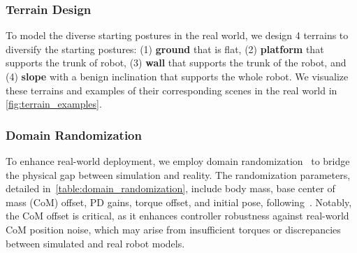 \subsubsection{Terrain Design}\label{subsec:terrain} To model the diverse starting postures in the real world, we design 4 terrains to diversify the starting postures: (1) \textbf{ground} that is flat, (2) \textbf{platform} that supports the trunk of robot, (3) \textbf{wall} that supports the trunk of the robot, and (4) \textbf{slope} with a benign inclination that supports the whole robot.  We visualize these terrains and examples of their corresponding scenes in the real world in \cref{fig:terrain_examples}. 


\subsubsection{Domain Randomization}\label{subsec:domain_randomization} To enhance real-world deployment, we employ domain randomization~\cite{tobin2017domain} to bridge the physical gap between simulation and reality. The randomization parameters, detailed in~\cref{table:domain_randomization}, include body mass, base center of mass (CoM) offset, PD gains, torque offset, and initial pose, following~\cite{campanaro2024learning,long2024learning}. Notably, the CoM offset is critical, as it enhances controller robustness against real-world CoM position noise, which may arise from insufficient torques or discrepancies between simulated and real robot models.


